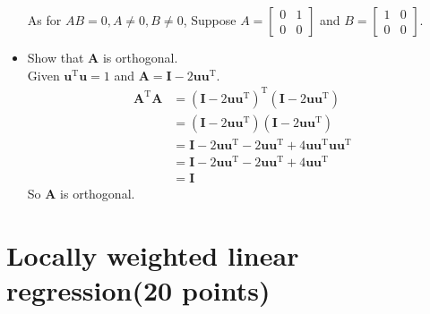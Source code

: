 \documentclass{article}
\begin{document}
\begin{itemize}
As for $AB = 0, A \not= 0, B\not=0$, Suppose $A=\begin{bmatrix}
	0 & 1\\0&0
\end{bmatrix}$ and $B=\begin{bmatrix}
	1 & 0\\0&0
\end{bmatrix}$.\\
\item Show that $\bm{A}$ is orthogonal.\\
Given $\bm{u}^{\mathrm{T}}\bm{u} = 1$ and $\bm{A} = \bm{I} - 2\bm{u}\bm{u}^{\mathrm{T}}$.\\
\begin{align*}
	\bm{A}^{\mathrm{T}}\bm{A} &= (\bm{I} - 2\bm{u}\bm{u}^{\mathrm{T}})^{\mathrm{T}}(\bm{I} - 2\bm{u}\bm{u}^{\mathrm{T}})\\
	&=(\bm{I} - 2\bm{u}\bm{u}^{\mathrm{T}})(\bm{I} - 2\bm{u}\bm{u}^{\mathrm{T}})\\
	&=\bm{I} - 2\bm{u}\bm{u}^{\mathrm{T}} - 2\bm{u}\bm{u}^{\mathrm{T}} + 4\bm{u}\bm{u}^{\mathrm{T}}\bm{u}\bm{u}^{\mathrm{T}}\\
	&=\bm{I} - 2\bm{u}\bm{u}^{\mathrm{T}} - 2\bm{u}\bm{u}^{\mathrm{T}} + 4\bm{u}\bm{u}^{\mathrm{T}}\\
	&=\bm{I}
\end{align*}
So $\bm{A}$ is orthogonal.
\end{itemize} 
\section{Locally weighted linear regression(20 points)}
\end{document}
